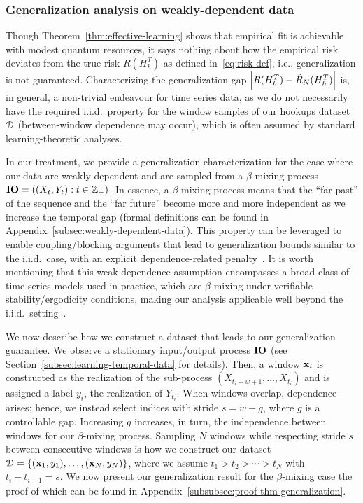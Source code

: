 \subsubsection{Generalization analysis on weakly-dependent data}\label{subsubsec:generalization}
Though Theorem~\ref{thm:effective-learning} shows that empirical fit is achievable with modest quantum resources, it says nothing about how the empirical risk deviates from the true risk $R(H^T_h)$ as defined in~\cref{eq:risk-def}, i.e., generalization is not guaranteed. Characterizing the generalization gap $\left| R(H^T_h) - \hat{R}_N(H^T_h) \right|$ is, in general, a non-trivial endeavour for time series data, as we do not necessarily have the required i.i.d.\ property for the window samples of our hookups dataset ${\mathcal{D}}$ (between-window dependence may occur), which is often assumed by standard learning-theoretic analyses.

In our treatment, we provide a generalization characterization for the case where our data are weakly dependent and are sampled from a $\beta$-mixing process $\mathbf{IO} = ((X_t, Y_t) : t \in {\mathbb{Z}}_-)$. In essence, a $\beta$-mixing process means that the ``far past'' of the sequence and the ``far future'' become more and more independent as we increase the temporal gap (formal definitions can be found in Appendix~\ref{subsec:weakly-dependent-data}). This property can be leveraged to enable coupling/blocking arguments that lead to generalization bounds similar to the i.i.d.\ case, with an explicit dependence-related penalty~\cite{mohri2008rademacher}. It is worth mentioning that this weak-dependence assumption encompasses a broad class of time series models used in practice, which are $\beta$-mixing under verifiable stability/ergodicity conditions, making our analysis applicable well beyond the i.i.d.\ setting~\cite{dedecker2007,Doukhan_1994,Carrasco2002}.

We now describe how we construct a dataset that leads to our generalization guarantee. We observe a stationary input/output process $\mathbf{IO}$ (see Section~\ref{subsec:learning-temporal-data} for details). Then, a window ${\mathbf{x}}_i$ is constructed as the realization of the sub-process $(X_{t_i - w + 1}, \ldots, X_{t_i})$ and is assigned a label $y_i$, the realization of $Y_{t_i}$. When windows overlap, dependence arises; hence, we instead select indices with stride $s = w + g$, where $g$ is a controllable gap. Increasing $g$ increases, in turn, the independence between windows for our $\beta$-mixing process. Sampling $N$ windows while respecting stride $s$ between consecutive windows is how we construct our dataset ${\mathcal{D}} = \{({\mathbf{x}}_1, y_1), \ldots, ({\mathbf{x}}_N, y_N)\}$, where we assume $t_1 > t_2 > \cdots > t_N$ with $t_i - t_{i+1} = s$. We now present our generalization result for the $\beta$-mixing case the proof of which can be found in Appendix~\ref{subsubsec:proof-thm-generalization}.



